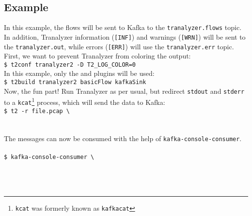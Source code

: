 \documentclass[documentation]{subfiles}
\begin{document}
\subsection{Example}

In this example, the flows will be sent to Kafka to the {\tt tranalyzer.flows} topic.
In addition, Tranalyzer information ({\tt [INF]}) and warnings ({\tt [WRN]}) will be sent to the {\tt tranalyzer.out}, while errors ({\tt [ERR]}) will use the {\tt tranalyzer.err} topic.\\

\noindent
First, we want to prevent Tranalyzer from coloring the output:\\

\noindent
{\tt \$ t2conf tranalyzer2 -D T2\_LOG\_COLOR=0}\\

\noindent
In this example, only the  and  plugins will be used:\\

\noindent
{\tt \$ t2build tranalyzer2 basicFlow kafkaSink}\\

\noindent
Now, the fun part! Run Tranalyzer as per usual, but redirect {\tt stdout} and {\tt stderr} to a {\tt kcat}\footnote{{\tt kcat} was formerly known as {\tt kafkacat}} process, which will send the data to Kafka:\\

\noindent
{\tt \$ t2 -r file.pcap \textbackslash{}}\\
\\
\\

\noindent
The messages can now be consumed with the help of {\tt kafka-console-consumer}.\\

\noindent
{\tt \color{blue}{\# Consume messages for tranalyzer.flows topic}}\\
{\tt \$ kafka-console-consumer \textbackslash{}}\\
\\
\\
\\
\end{document}
